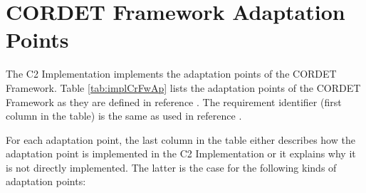\documentclass{pnp_article}
\begin{document}
\begin{landscape}


\end{landscape}





\section{CORDET Framework Adaptation Points}\label{sec:implCrFwAp}
The C2 Implementation implements the adaptation points of the CORDET Framework.
Table \ref{tab:implCrFwAp} lists the adaptation points of the CORDET Framework as they are defined in reference \cite{ref:cordetfw}. The requirement identifier (first column in the table) is the same as used in reference \cite{ref:cordetfw}. 

For each adaptation point, the last column in the table either describes how the adaptation point is implemented in the C2 Implementation or it explains why it is not directly implemented. The latter is the case for the following kinds of adaptation points:
\end{document}
